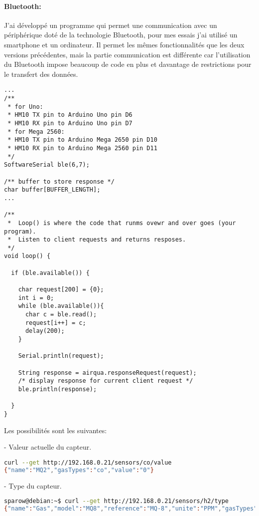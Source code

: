 \paragraph{Bluetooth:}
J'ai développé un programme qui permet une communication avec un périphérique doté de la technologie Bluetooth, pour mes essais j'ai utilisé un smartphone et un ordinateur.
Il permet les mêmes fonctionnalités que les deux versions précédentes, mais la partie communication est différente car l'utilisation du Bluetooth impose beaucoup de code en plus et davantage de restrictions pour le transfert des données.

\begin{lstlisting}
...
/** 
 * for Uno:
 * HM10 TX pin to Arduino Uno pin D6
 * HM10 RX pin to Arduino Uno pin D7
 * for Mega 2560: 
 * HM10 TX pin to Arduino Mega 2650 pin D10
 * HM10 RX pin to Arduino Mega 2560 pin D11
 */
SoftwareSerial ble(6,7);        

/** buffer to store response */
char buffer[BUFFER_LENGTH];   
...

/**
 *  Loop() is where the code that runms ovewr and over goes (your program).
 *  Listen to client requests and returns resposes.
 */
void loop() {
  
  if (ble.available()) {

    char request[200] = {0};
    int i = 0;
    while (ble.available()){
      char c = ble.read();
      request[i++] = c;
      delay(200); 
    }

    Serial.println(request);

    String response = airqua.responseRequest(request);
    /* display response for current client request */
    ble.println(response);

  } 
}

\end{lstlisting}

Les possibilités sont les suivantes:

- Valeur actuelle du capteur.
\begin{lstlisting}[language=bash]
curl --get http://192.168.0.21/sensors/co/value
{"name":"MQ2","gasTypes":"co","value":"0"}
\end{lstlisting}

- Type du capteur.
\begin{lstlisting}[language=bash]
sparow@debian:~$ curl --get http://192.168.0.21/sensors/h2/type
{"name":"Gas","model":"MQ8","reference":"MQ-8","unite":"PPM","gasTypes":["H2"]}
\end{lstlisting}

